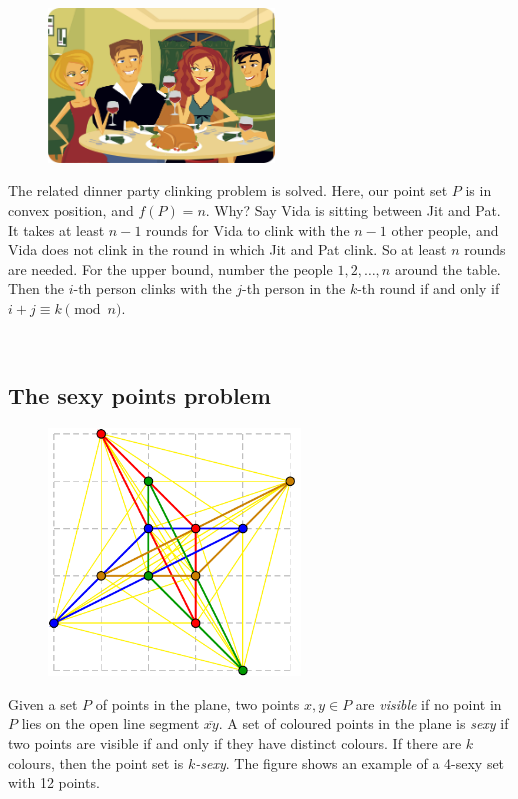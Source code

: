 \documentclass{patmorin}
\newcommand{\poser}[1]{\noindent{\textit{#1}}}
\begin{document}
\begin{figure}
\includegraphics[width=6cm]{dinner}
\end{figure}

The related dinner party clinking problem is solved. Here, our point
set $P$ is in convex position, and $f(P)=n$. Why? Say Vida is sitting
between Jit and Pat. It takes at least $n-1$ rounds for Vida to clink
with the $n-1$ other people, and Vida does not clink in the round in
which Jit and Pat clink. So at least $n$ rounds are needed. For the upper
bound, number the people $1,2,\dots,n$ around the table. Then the $i$-th
person clinks with the $j$-th person in the $k$-th round if and only if
$i+j\equiv k\pmod{n}$.

\newpage %

\  %

\subsection{The sexy points problem}

\poser{David Wood}

\begin{figure}
\hfill
\includegraphics[width=67mm]{K3333}
\end{figure}
Given a set $P$ of points in the plane, two points $x,y\in P$
are \emph{visible} if no point in $P$ lies on the open line segment
$\overline{xy}$. A set of coloured points in the plane is \emph{sexy}
if two points are visible if and only if they have distinct colours. If
there are $k$ colours, then the point set is \emph{$k$-sexy}. The figure
shows an example of a 4-sexy set with 12 points.
\end{document}
